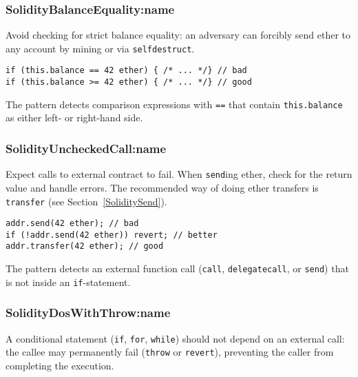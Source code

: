 \subsubsection{\let\letcs\texapiletcs \usevalue SolidityBalanceEquality:name \let\letcs\etoolboxletcs}
\label{SolidityBalanceEquality}

Avoid checking for strict balance equality: an adversary can forcibly send ether to any account by mining or via \texttt{selfdestruct}.
\begin{lstlisting}[language=Solidity]
if (this.balance == 42 ether) { /* ... */} // bad
if (this.balance >= 42 ether) { /* ... */} // good
\end{lstlisting}

The pattern detects comparison expressions with \texttt{==} that contain \texttt{this.balance} as either left- or right-hand side.

\subsubsection{\let\letcs\texapiletcs \usevalue SolidityUncheckedCall:name \let\letcs\etoolboxletcs} \label{SolidityUncheckedCall}

Expect calls to external contract to fail.
When \texttt{send}ing ether, check for the return value and handle errors.
The recommended way of doing ether transfers is \texttt{transfer} (see Section~\ref{SoliditySend}).
\begin{lstlisting}[language=Solidity]
addr.send(42 ether); // bad
if (!addr.send(42 ether)) revert; // better
addr.transfer(42 ether); // good
\end{lstlisting}

The pattern detects an external function call (\texttt{call}, \texttt{delegatecall}, or \texttt{send}) that is not inside an \texttt{if}-statement.

\subsubsection{\let\letcs\texapiletcs \usevalue SolidityDosWithThrow:name \let\letcs\etoolboxletcs} \label{SolidityDosWithThrow}

A conditional statement (\texttt{if}, \texttt{for}, \texttt{while}) should not depend on an external call: the callee may permanently fail (\texttt{throw} or \texttt{revert}), preventing the caller from completing the execution.

